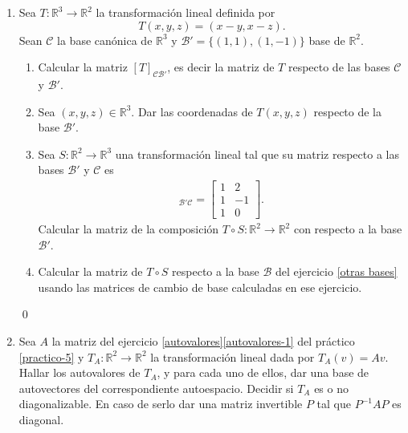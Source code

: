 \begin{enumerate}[topsep=6pt, itemsep=.4cm]
\rta


\qed



\item\label{matriz transformaciones ejemplo} Sea 
$T:\mathbb{R}^3\longrightarrow\mathbb{R}^2$ la transformación lineal definida por $$T(x,y,z)=(x-y,x-z).$$ Sean $\mathcal{C}$ la base canónica de $\mathbb{R}^3$ y $\mathcal{B}'=\{(1,1),(1,-1)\}$ base de $\mathbb{R}^2$.
\begin{enumerate}
    \item\label{matriz transformaciones ejemplo-a} Calcular la matriz $[T]_{\mathcal{C}\mathcal{B}'}$, es decir la matriz de $T$ respecto de las bases $\mathcal{C}$ y $\mathcal{B}'$.
    \item\label{matriz transformaciones ejemplo-b} Sea $(x,y,z)\in\mathbb{R}^3$. Dar las coordenadas de $T(x,y,z)$ respecto de la base $\mathcal{B}'$.
    \item\label{matriz transformaciones ejemplo-c} Sea $S:\mathbb{R}^2\longrightarrow\mathbb{R}^3$ una transformación lineal tal que su matriz respecto a las bases $\mathcal{B}'$ y $\mathcal{C}$ es
    \begin{align*}
    [S]_{\mathcal{B}'\mathcal{C}}=\begin{bmatrix}
    1&2\\1&-1\\1&0
    \end{bmatrix}. 
    \end{align*}
    Calcular la matriz de la composición $T\circ S:\mathbb{R}^2\longrightarrow\mathbb{R}^2$ con respecto a la base $\mathcal{B}'$. 
    \item\label{matriz transformaciones ejemplo-d} Calcular la matriz de $T\circ S$ respecto a la base $\mathcal{B}$ del ejercicio \ref{otras bases} usando las matrices de cambio de base calculadas en ese ejercicio.
\end{enumerate}

\rta


\qed



\item Sea $A$ la matriz  del ejercicio \ref{autovalores}\ref{autovalores-1} del práctico \ref{practico-5} y $T_A:\mathbb{R}^2\longrightarrow\mathbb{R}^2$ la transformación lineal dada por $T_A(v)=Av$. Hallar los autovalores de $T_A$, y para cada uno de ellos, dar una base de autovectores del correspondiente autoespacio. Decidir si $T_A$ es o no diagonalizable. En caso de serlo dar una matriz invertible $P$ tal que $P^{-1}AP$ es diagonal. 


\end{enumerate}
